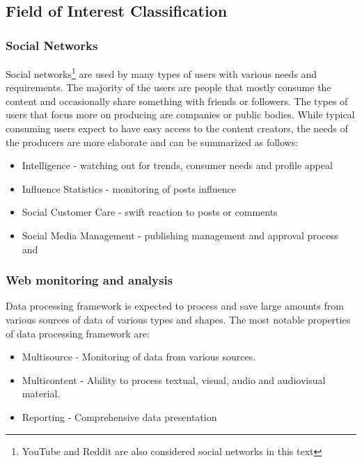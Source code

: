 \subsection{Field of Interest Classification}

\subsubsection{Social Networks}

Social networks\footnote{YouTube and Reddit are also considered social networks in this text} are used by many types of users with various needs and requirements. The majority of the users are people that mostly consume the content and occasionally share something with friends or followers. The types of users that focus more on producing are companies or public bodies. While typical consuming users expect to have easy access to the content creators, the needs of the producers are more elaborate and can be summarized as follows:

\begin{itemize}
    \item Intelligence - watching out for trends, consumer needs and profile appeal
    \item Influence Statistics - monitoring of posts influence
    \item Social Customer Care - swift reaction to posts or comments
    \item Social Media Management - publishing management and approval process and
\end{itemize}



\subsubsection{Web monitoring and analysis}

Data processing framework is expected to process and save large amounts from various sources of data of various types and shapes. The most notable properties of data processing framework are:

\begin{itemize}
    \item Multisource - Monitoring of data from various sources. 
    \item Multicontent - Ability to process textual, visual, audio and audiovisual material.
    \item Reporting - Comprehensive data presentation
\end{itemize}

